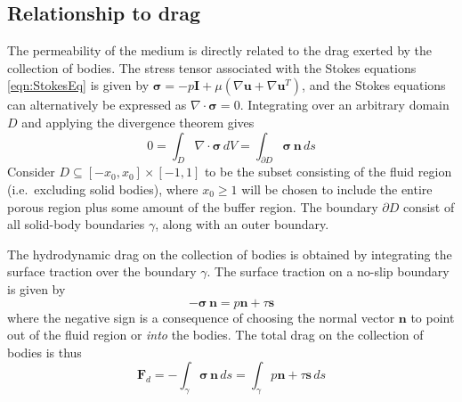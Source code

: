 \documentclass[3p]{elsarticle}
\newcommand{\grad}{{\nabla}}
\newcommand{\nn}{{\mathbf{n}}}
\renewcommand{\ss}{{\mathbf{s}}}
\newcommand{\uu}{{\mathbf{u}}}
\newcommand{\bvec}[1]{\mathbf{#1}}
\newcommand {\bq} {\bvec{q}}
\newcommand{\qavg}{\bar{q}}
\newcommand{\stress}{{\boldsymbol \sigma}}
\newcommand{\FD}{\bvec{F}_d}
\begin{document}
 

\subsection{Relationship to drag}

The permeability of the medium is directly related to the drag exerted by the collection of bodies. The stress tensor associated with the Stokes equations \eqref{eqn:StokesEq} is given by $\stress = -p \bvec{I} + \mu \left( \grad \uu + \grad \uu^T \right)$, and the Stokes equations can alternatively be expressed as $\grad \cdot \stress = 0$. Integrating over an arbitrary domain $D$ and applying the divergence theorem gives
\begin{equation}
\label{divthm}
0 = \int_{D} \grad \cdot \stress \, dV 
= \int_{\partial D} \stress \, \nn \, ds
\end{equation}
Consider $D \subseteq [-x_0, x_0] \times [-1, 1]$ to be the subset consisting of the fluid region (i.e.~excluding solid bodies), where $x_0 \ge 1$ will be chosen to include the entire porous region plus some amount of the buffer region. The boundary $\partial D$ consist of all solid-body boundaries $\gamma$, along with an outer boundary. 

The hydrodynamic drag on the collection of bodies is obtained by integrating the surface traction over the boundary $\gamma$. The surface traction on a no-slip boundary is given by 
\begin{equation}
- \stress \, \nn = p \nn + \tau \ss
\end{equation}
where the negative sign is a consequence of choosing the normal vector $\nn$ to point out of the fluid region or {\em into} the bodies. The total drag on the collection of bodies is thus
\begin{equation}
\label{eqn:drag}
\FD =  - \int_{\gamma} \stress \, \nn \, ds =  \int_{\gamma} p \nn + \tau \ss \, ds
\end{equation}

\end{document}
